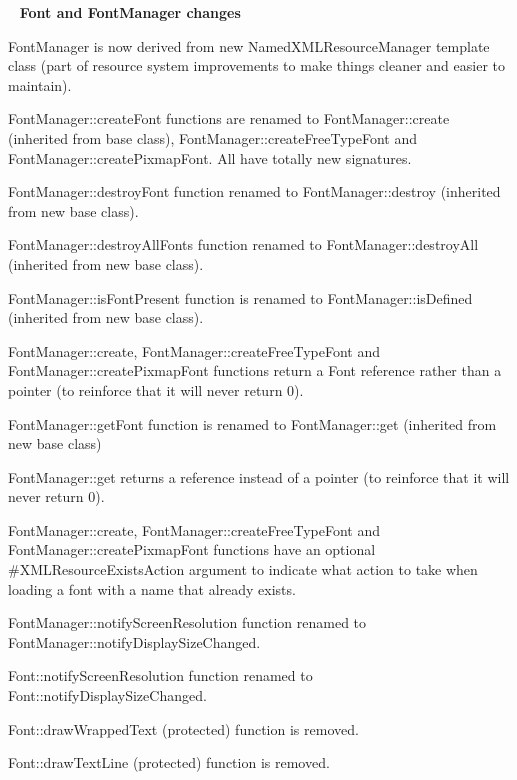 ~\newline
 {\bfseries{Font and Font\+Manager changes}}
\begin{DoxyItemize}
\item Font\+Manager is now derived from new Named\+X\+M\+L\+Resource\+Manager template class (part of resource system improvements to make things cleaner and easier to maintain).
\item {\ttfamily Font\+Manager\+::create\+Font} functions are renamed to Font\+Manager\+::create (inherited from base class), Font\+Manager\+::create\+Free\+Type\+Font and Font\+Manager\+::create\+Pixmap\+Font. All have totally new signatures.
\item {\ttfamily Font\+Manager\+::destroy\+Font} function renamed to Font\+Manager\+::destroy (inherited from new base class).
\item {\ttfamily Font\+Manager\+::destroy\+All\+Fonts} function renamed to Font\+Manager\+::destroy\+All (inherited from new base class).
\item {\ttfamily Font\+Manager\+::is\+Font\+Present} function is renamed to Font\+Manager\+::is\+Defined (inherited from new base class).
\item Font\+Manager\+::create, Font\+Manager\+::create\+Free\+Type\+Font and Font\+Manager\+::create\+Pixmap\+Font functions return a Font reference rather than a pointer (to reinforce that it will never return 0).
\item {\ttfamily Font\+Manager\+::get\+Font} function is renamed to Font\+Manager\+::get (inherited from new base class)
\item Font\+Manager\+::get returns a reference instead of a pointer (to reinforce that it will never return 0).
\item Font\+Manager\+::create, Font\+Manager\+::create\+Free\+Type\+Font and Font\+Manager\+::create\+Pixmap\+Font functions have an optional \#\+X\+M\+L\+Resource\+Exists\+Action argument to indicate what action to take when loading a font with a name that already exists.
\item {\ttfamily Font\+Manager\+::notify\+Screen\+Resolution} function renamed to Font\+Manager\+::notify\+Display\+Size\+Changed.
\item {\ttfamily Font\+::notify\+Screen\+Resolution} function renamed to Font\+::notify\+Display\+Size\+Changed.
\item {\ttfamily Font\+::draw\+Wrapped\+Text} (protected) function is removed.
\item {\ttfamily Font\+::draw\+Text\+Line} (protected) function is removed.

\end{DoxyItemize}
